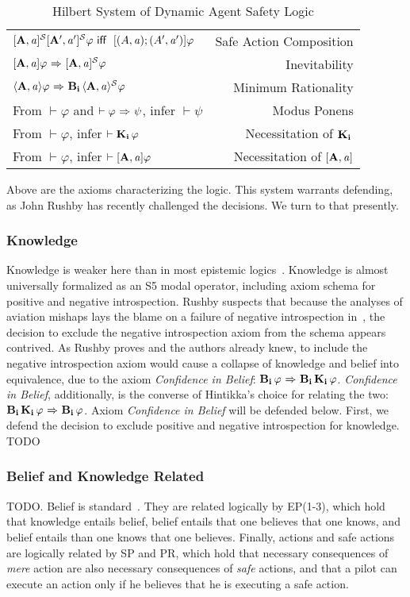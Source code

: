 \begin{table}[H]
\begin{center}
\begin{tabular}{| l r |}
    $\mathbf{[A,\mathit{a}]^\mathcal{S}}\mathbf{[A',\mathit{a}']^\mathcal{S}}\varphi \textsf{\ iff \ } [(A,\mathit{a});(A',\mathit{a}')]\varphi$ & Safe Action Composition \\
    $\mathbf{[A,\mathit{a}]}\varphi {\ \Rightarrow \ } \mathbf{[A,\mathit{a}]^\mathcal{S}}\varphi$ & Inevitability\\
    $\mathbf{\langle A,\mathit{a}\rangle}\varphi {\ \Rightarrow \ } \mathbf{B}_{\mathbf{i}}\,\mathbf{\langle A,\mathit{a}\rangle^\mathcal{S}}\varphi$ & Minimum Rationality\\
    From $\vdash \varphi$ and $\vdash \varphi {\ \Rightarrow \ } \psi$, infer $\vdash\psi$ & Modus Ponens\\
    From $\vdash \varphi$, infer $\vdash \mathbf{K}_{\mathbf{i}}\,\varphi$ & Necessitation of $\mathbf{K}_{\mathbf{i}}\,$\\
    From $\vdash \varphi$, infer $\vdash \mathbf{[A,\mathit{a}]}\varphi$ & Necessitation of $\mathbf{[A,\mathit{a}]}$\\
	\hline
\end{tabular}
\caption{Hilbert System of Dynamic Agent Safety Logic}
\end{center}
\end{table}

Above are the axioms characterizing the logic. This system warrants defending, as John Rushby has recently challenged the decisions. We turn to that presently. 

\subsubsection*{Knowledge}
Knowledge is weaker here than in most epistemic logics~\cite{FHMV,DEL,Hintikka}. Knowledge is almost universally formalized as an S5 modal operator, including axiom schema for positive and negative introspection. Rushby suspects that because the analyses of aviation mishaps lays the blame on a failure of negative introspection in~\cite{AhrenbachGoodloe}, the decision to exclude the negative introspection axiom from the schema appears contrived. As Rushby proves and the authors already knew, to include the negative introspection axiom would cause a collapse of knowledge and belief into equivalence, due to the axiom \emph{Confidence in Belief}: $\mathbf{B}_{\mathbf{i}}\,\varphi {\ \Rightarrow \ } \mathbf{B}_{\mathbf{i}}\,\mathbf{K}_{\mathbf{i}}\,\varphi$. \emph{Confidence in Belief}, additionally, is the converse of Hintikka's choice for relating the two: $\mathbf{B}_{\mathbf{i}}\,\mathbf{K}_{\mathbf{i}}\,\varphi {\ \Rightarrow \ } \mathbf{B}_{\mathbf{i}}\,\varphi$. Axiom \emph{Confidence in Belief} will be defended below. First, we defend the decision to exclude positive and negative introspection for knowledge. TODO



\subsubsection*{Belief and Knowledge Related}
TODO. Belief is standard~\cite{FHMV}. They are related logically by EP(1-3), which hold that knowledge entails belief, belief entails that one believes that one knows, and belief entails than one knows that one believes. Finally, actions and safe actions are logically related by SP and PR, which hold that necessary consequences of \emph{mere} action are also necessary consequences of \emph{safe} actions, and that a pilot can execute an action only if he believes that he is executing a safe action. 


